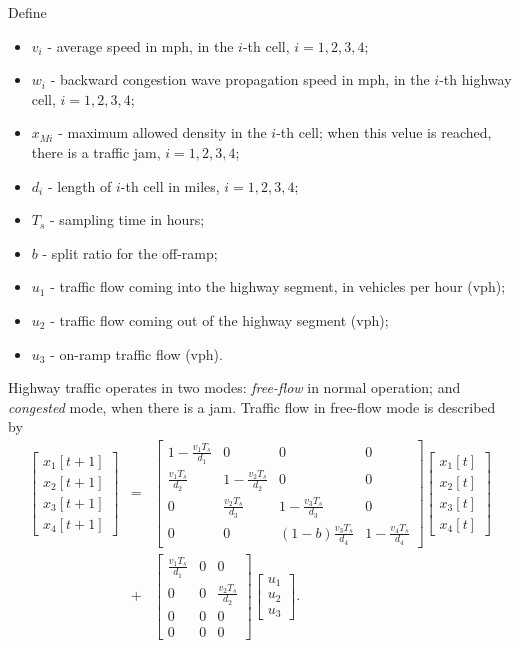 \documentclass{report}
\begin{document}
Define
\begin{itemize}
\item $v_i$ - average  speed in mph,
in the $i$-th cell, $i=1,2,3,4$;
\item $w_i$ - backward congestion wave propagation speed in mph,
in the $i$-th highway cell, $i=1,2,3,4$;
\item $x_{Mi}$ - maximum allowed density in the $i$-th cell;
when this velue is reached, there is a traffic jam, $i=1,2,3,4$;
\item $d_i$ - length of $i$-th cell in miles, $i=1,2,3,4$;
\item $T_s$ - sampling time in hours;
\item $b$ - split ratio for the off-ramp;
\item $u_1$ - traffic flow coming into the highway segment,
in vehicles per hour (vph);
\item $u_2$ - traffic flow coming out of the highway segment (vph);
\item $u_3$ - on-ramp traffic flow (vph).
\end{itemize}
Highway traffic operates in two modes: {\it free-flow} in normal operation;
and {\it congested} mode, when there is a jam.
Traffic flow in free-flow mode is described by
\begin{eqnarray}
\left[\begin{array}{c}
x_1[t+1]\\
x_2[t+1]\\
x_3[t+1]\\
x_4[t+1]\end{array}\right] & = & \left[\begin{array}{cccc}
1-\frac{v_1T_s}{d_1} & 0 & 0 & 0\\
\frac{v_1T_s}{d_2} & 1-\frac{v_2T_s}{d_2} & 0 & 0\\
0 & \frac{v_2T_s}{d_3} & 1-\frac{v_3T_s}{d_3} & 0\\
0 & 0 & (1-b)\frac{v_3T_s}{d_4} & 1-\frac{v_4T_s}{d_4}\end{array}\right]
\left[\begin{array}{c}
x_1[t]\\
x_2[t]\\
x_3[t]\\
x_4[t]\end{array}\right] \nonumber\\
& + & \left[\begin{array}{ccc}
\frac{v_1T_s}{d_1} & 0 & 0\\
0 & 0 & \frac{v_2T_s}{d_2}\\
0 & 0 & 0\\
0 & 0 & 0\end{array}\right]\left[\begin{array}{c}
u_1\\
u_2\\
u_3\end{array}\right]. \label{fflow}
\end{eqnarray}
\end{document}
